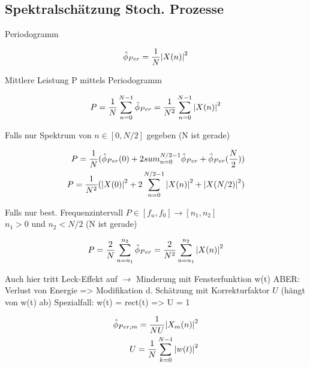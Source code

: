 \documentclass[10pt,a4paper]{article}
\begin{document}
\subsection{Spektralschätzung Stoch. Prozesse}
Periodogramm
  \begin{mdframed}[style=exercise]
    \begin{align}
        \hat{\phi}_{Per} = \frac{1}{N}\abs{X(n)}^2
    \end{align}
  \end{mdframed}
Mittlere Leistung P mittels Periodogramm
  \begin{mdframed}[style=exercise]
    \begin{align}
        P = \frac{1}{N}\sum_{n=0}^{N-1} \hat{\phi}_{Per} = \frac{1}{N^2}\sum_{n=0}^{N-1} \abs{X(n)}^2
    \end{align}
  \end{mdframed}
Falls nur Spektrum von $n\in [0,N/2]$ gegeben (N ist gerade)
  \begin{mdframed}[style=exercise]
    \begin{align}
        P = \frac{1}{N}( \hat{\phi}_{Per}(0) + 2 sum_{n=0}^{N/2-1} \hat{\phi}_{Per} + \hat{\phi}_{Per}(\frac{N}{2})) \\
        P = \frac{1}{N^2}( \abs{X(0)}^2 + 2 \sum_{n=0}^{N/2-1} \abs{X(n)}^2 + \abs{X(N/2)}^2) 
    \end{align}
  \end{mdframed}
Falls nur best. Frequenzintervall $P\in [f_u,f_0] \rightarrow [n_1,n_2]$\\ 
$n_{1} > 0$ und $n_{2} < N/2$ (N ist gerade)
  \begin{mdframed}[style=exercise]
    \begin{align}
        P = \frac{2}{N}\sum_{n=n_1}^{n_2} \hat{\phi}_{Per} = \frac{2}{N^2}\sum_{n=n_1}^{n_2} \abs{X(n)}^2
    \end{align}
  \end{mdframed}
Auch hier tritt Leck-Effekt auf $\rightarrow$ Minderung mit Fensterfunktion w(t) 
ABER: Verlust von Energie => Modifikation d. Schätzung mit Korrekturfaktor $U$ (hängt von w(t) ab)
Spezialfall: w(t) = rect(t) => U = 1 
  \begin{mdframed}[style=exercise]
    \begin{align}
        \hat{\phi}_{Per,m} = \frac{1}{NU}\abs{X_m(n)}^2\\
        U = \frac{1}{N}\sum_{k=0}^{N-1} \abs{w(t)}^2 
    \end{align}
  \end{mdframed}
\end{document}
